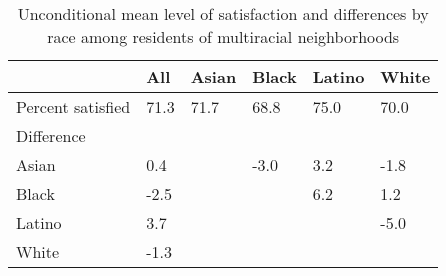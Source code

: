 % 
\begin{sidewaystable}[ht]
\centering
\caption{Unconditional mean level of satisfaction and differences by race among residents of multiracial neighborhoods} 
\label{tab:descwn}
\begin{tabular}{lR{4em}R{4em}R{4em}R{4em}R{4em}}
  \toprule
 & All & Asian & Black & Latino & White \\ 
  \midrule
Percent satisfied & 71.3 & 71.7 & 68.8 & 75.0 & 70.0 \\ 
  Difference &  &  &  &  &  \\ 
  Asian & 0.4 &  & -3.0 & 3.2 & -1.8 \\ 
  Black & -2.5 &  &  & 6.2 & 1.2 \\ 
  Latino & 3.7 &  &  &  & -5.0 \\ 
  White & -1.3 &  &  &  &  \\ 
   \bottomrule
\end{tabular}
\end{sidewaystable}
